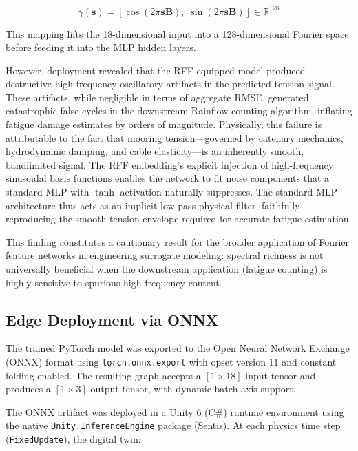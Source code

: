 \documentclass[preprint,12pt]{elsarticle}
\begin{document}
\begin{equation}
\label{eq:rff}
    \gamma(\mathbf{s}) = \left[\cos\!\left(2\pi \mathbf{s} \mathbf{B}\right),\; \sin\!\left(2\pi \mathbf{s} \mathbf{B}\right)\right] \in \mathbb{R}^{128}
\end{equation}

\noindent This mapping lifts the 18-dimensional input into a 128-dimensional Fourier space before feeding it into the MLP hidden layers.

However, deployment revealed that the RFF-equipped model produced destructive high-frequency oscillatory artifacts in the predicted tension signal. These artifacts, while negligible in terms of aggregate RMSE, generated catastrophic false cycles in the downstream Rainflow counting algorithm, inflating fatigue damage estimates by orders of magnitude. Physically, this failure is attributable to the fact that mooring tension---governed by catenary mechanics, hydrodynamic damping, and cable elasticity---is an inherently smooth, bandlimited signal. The RFF embedding's explicit injection of high-frequency sinusoidal basis functions enables the network to fit noise components that a standard MLP with $\tanh$ activation naturally suppresses. The standard MLP architecture thus acts as an implicit low-pass physical filter, faithfully reproducing the smooth tension envelope required for accurate fatigue estimation.

This finding constitutes a cautionary result for the broader application of Fourier feature networks in engineering surrogate modeling: spectral richness is not universally beneficial when the downstream application (fatigue counting) is highly sensitive to spurious high-frequency content.

\subsection{Edge Deployment via ONNX}
\label{sec:deployment}

The trained PyTorch model was exported to the Open Neural Network Exchange (ONNX) format \cite{onnx2019} using \texttt{torch.onnx.export} with opset version 11 and constant folding enabled. The resulting graph accepts a $[1 \times 18]$ input tensor and produces a $[1 \times 3]$ output tensor, with dynamic batch axis support.

The ONNX artifact was deployed in a Unity 6 (C\#) runtime environment using the native \texttt{Unity.InferenceEngine} package (Sentis). At each physics time step (\texttt{FixedUpdate}), the digital twin:
\end{document}
